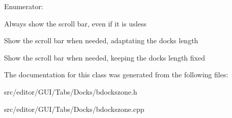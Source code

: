 \begin{Desc}
\item[\-Enumerator\-: ]\par
\begin{description}
\item[{\em 
\hypertarget{class_b_docks_zone_aaa04c632b39dce77b61a3a28b7418fdda56cc1afb42c3bd98e3e64599883383a5}{\-Always\-Visible}\label{class_b_docks_zone_aaa04c632b39dce77b61a3a28b7418fdda56cc1afb42c3bd98e3e64599883383a5}
}]\-Always show the scroll bar, even if it is usless \item[{\em 
\hypertarget{class_b_docks_zone_aaa04c632b39dce77b61a3a28b7418fdda4907ef1b3e3b8174073ec707a9753105}{\-Adjustable}\label{class_b_docks_zone_aaa04c632b39dce77b61a3a28b7418fdda4907ef1b3e3b8174073ec707a9753105}
}]\-Show the scroll bar when needed, adaptating the docks length \item[{\em 
\hypertarget{class_b_docks_zone_aaa04c632b39dce77b61a3a28b7418fddae1dd9bb823904efc8224bffef1fe6f22}{\-Fixed}\label{class_b_docks_zone_aaa04c632b39dce77b61a3a28b7418fddae1dd9bb823904efc8224bffef1fe6f22}
}]\-Show the scroll bar when needed, keeping the docks length fixed \end{description}
\end{Desc}



\-The documentation for this class was generated from the following files\-:\begin{DoxyCompactItemize}
\item 
src/editor/\-G\-U\-I/\-Tabs/\-Docks/bdockszone.\-h\item 
src/editor/\-G\-U\-I/\-Tabs/\-Docks/bdockszone.\-cpp\end{DoxyCompactItemize}
